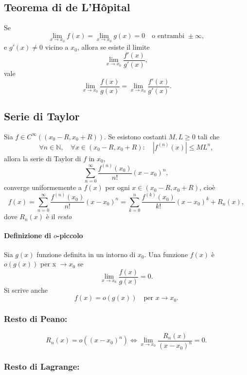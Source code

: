 \documentclass[12pt,a4paper]{article}
\begin{document}
\subsection*{Teorema di de L'Hôpital}

Se  
\[
\lim_{x \to x_0} f(x) = \lim_{x \to x_0} g(x) = 0 \quad \text{o entrambi } \pm \infty,
\]
e \( g'(x) \neq 0 \) vicino a \( x_0 \), allora se esiste il limite  
\[
\lim_{x \to x_0} \frac{f'(x)}{g'(x)},
\]
vale  
\[
\lim_{x \to x_0} \frac{f(x)}{g(x)} = \lim_{x \to x_0} \frac{f'(x)}{g'(x)}.
\]

\subsection*{Serie di Taylor}

Sia \( f \in C^\infty((x_0 - R, x_0 + R)) \). Se esistono costanti \( M, L \geq 0 \) tali che
\[
\forall n \in \mathbb{N}, \quad \forall x \in (x_0 - R, x_0 + R): \quad |f^{(n)}(x)| \leq M L^n,
\]
allora la serie di Taylor di \( f \) in \( x_0 \),
\[
\sum_{n=0}^\infty \frac{f^{(n)}(x_0)}{n!}(x - x_0)^n,
\]
converge uniformemente a \( f(x) \) per ogni \( x \in (x_0 - R, x_0 + R) \), cioè
\[
f(x) = \sum_{n=0}^\infty \frac{f^{(n)}(x_0)}{n!}(x - x_0)^n
= \sum_{k=0}^n \frac{f^{(k)}(x_0)}{k!} (x - x_0)^k + R_n(x),
\]
dove \( R_n(x) \) è il \emph{resto}

\paragraph{Definizione di \( o \)-piccolo}
Sia \( g(x) \) funzione definita in un intorno di \( x_0 \).  
Una funzione \( f(x) \) è \( o(g(x)) \) per x \(\to x_0 \) se
\[
\lim_{x \to x_0} \frac{f(x)}{g(x)} = 0.
\]
Si scrive anche
\[
f(x) = o(g(x)) \quad \text{per } x \to x_0.
\]

\subsubsection*{Resto di Peano:}

\[
R_n(x) = o((x - x_0)^n) \iff \lim_{x \to x_0} \frac{R_n(x)}{(x - x_0)^n} = 0.
\]

\subsubsection*{Resto di Lagrange:}
\end{document}
